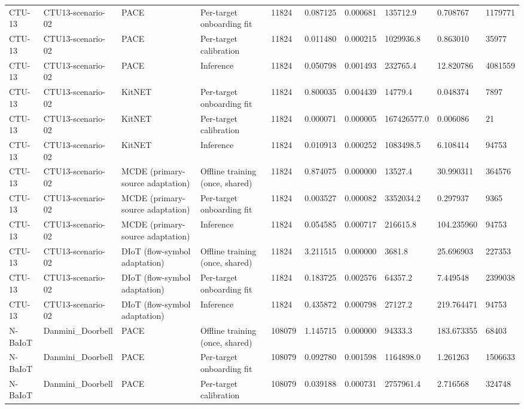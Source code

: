 \begin{tabular}{llllllllll}
CTU-13 & CTU13-scenario-02 & PACE & Per-target onboarding fit & 11824 & 0.087125 & 0.000681 & 135712.9 & 0.708767 & 1179771 \\
CTU-13 & CTU13-scenario-02 & PACE & Per-target calibration & 11824 & 0.011480 & 0.000215 & 1029936.8 & 0.863010 & 35977 \\
CTU-13 & CTU13-scenario-02 & PACE & Inference & 11824 & 0.050798 & 0.001493 & 232765.4 & 12.820786 & 4081559 \\
CTU-13 & CTU13-scenario-02 & KitNET & Per-target onboarding fit & 11824 & 0.800035 & 0.004439 & 14779.4 & 0.048374 & 7897 \\
CTU-13 & CTU13-scenario-02 & KitNET & Per-target calibration & 11824 & 0.000071 & 0.000005 & 167426577.0 & 0.006086 & 21 \\
CTU-13 & CTU13-scenario-02 & KitNET & Inference & 11824 & 0.010913 & 0.000252 & 1083498.5 & 6.108414 & 94753 \\
CTU-13 & CTU13-scenario-02 & MCDE (primary-source adaptation) & Offline training (once, shared) & 11824 & 0.874075 & 0.000000 & 13527.4 & 30.990311 & 364576 \\
CTU-13 & CTU13-scenario-02 & MCDE (primary-source adaptation) & Per-target onboarding fit & 11824 & 0.003527 & 0.000082 & 3352034.2 & 0.297937 & 9365 \\
CTU-13 & CTU13-scenario-02 & MCDE (primary-source adaptation) & Inference & 11824 & 0.054585 & 0.000717 & 216615.8 & 104.235960 & 94753 \\
CTU-13 & CTU13-scenario-02 & DIoT (flow-symbol adaptation) & Offline training (once, shared) & 11824 & 3.211515 & 0.000000 & 3681.8 & 25.696903 & 227353 \\
CTU-13 & CTU13-scenario-02 & DIoT (flow-symbol adaptation) & Per-target onboarding fit & 11824 & 0.183725 & 0.002576 & 64357.2 & 7.449548 & 2399038 \\
CTU-13 & CTU13-scenario-02 & DIoT (flow-symbol adaptation) & Inference & 11824 & 0.435872 & 0.000798 & 27127.2 & 219.764471 & 94753 \\
N-BaIoT & Danmini\_Doorbell & PACE & Offline training (once, shared) & 108079 & 1.145715 & 0.000000 & 94333.3 & 183.673355 & 68403 \\
N-BaIoT & Danmini\_Doorbell & PACE & Per-target onboarding fit & 108079 & 0.092780 & 0.001598 & 1164898.0 & 1.261263 & 1506633 \\
N-BaIoT & Danmini\_Doorbell & PACE & Per-target calibration & 108079 & 0.039188 & 0.000731 & 2757961.4 & 2.716568 & 324748 \\

\end{tabular}
